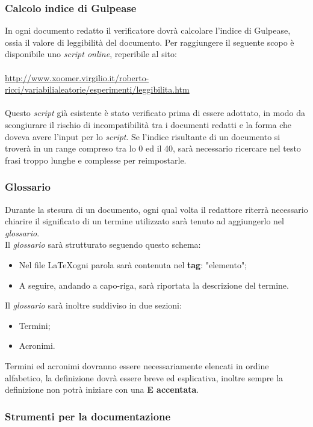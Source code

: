 \subsubsection{Calcolo indice di Gulpease}
In ogni documento redatto il verificatore dovrà calcolare l'indice di Gulpease, ossia il valore di leggibilità del documento.
Per raggiungere il seguente scopo è disponibile uno \textit{script online}, reperibile al sito:\\
\\
\href{http://xoomer.virgilio.it/roberto-ricci/variabilialeatorie/esperimenti/leggibilita.htm}{http://www.xoomer.virgilio.it/roberto-ricci/variabilialeatorie/esperimenti/leggibilita.htm}
\\ \\
Questo \textit{script} già esistente è stato verificato prima di essere adottato, in modo da scongiurare il rischio di incompatibilità tra i documenti redatti e la forma che doveva avere l'input per lo \textit{script}.
Se l'indice risultante di un documento si troverà in un range compreso tra lo 0 ed il 40, sarà necessario ricercare nel testo frasi troppo lunghe e complesse per reimpostarle.


\subsubsection{Glossario}
Durante la stesura di un documento, ogni qual volta il redattore riterrà necessario chiarire il significato di un termine utilizzato sarà tenuto ad aggiungerlo nel \textit{glossario}.\\
Il \textit{glossario} sarà strutturato seguendo questo schema:
\begin{itemize}
\item Nel file \LaTeX ogni parola sarà contenuta nel \textbf{tag}: "elemento";
\item A seguire, andando a capo-riga, sarà riportata la descrizione del termine.
\end{itemize}
Il \textit{glossario} sarà inoltre suddiviso in due sezioni:
\begin{itemize}
\item Termini;
\item Acronimi.
\end{itemize}
Termini ed acronimi dovranno essere necessariamente elencati in ordine alfabetico, la definizione dovrà essere breve ed esplicativa, inoltre sempre la definizione non potrà iniziare con una \textbf{E accentata}.
\subsubsection{Strumenti per la documentazione}
